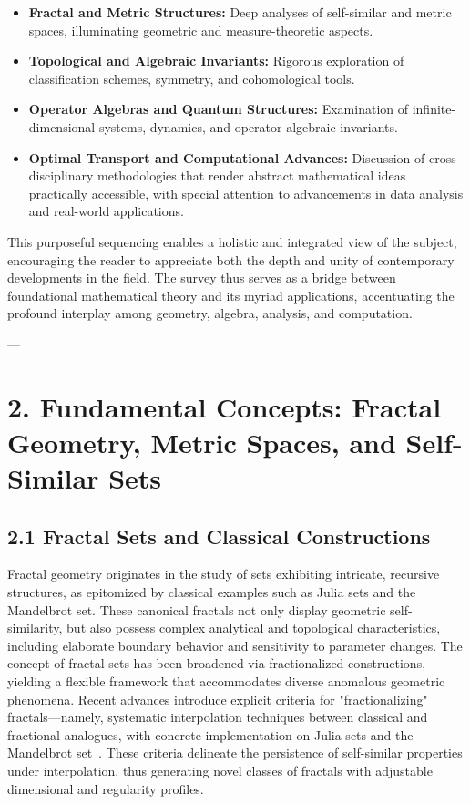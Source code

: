\documentclass[11pt]{article}
\begin{document}
\begin{itemize}
    \item \textbf{Fractal and Metric Structures:} Deep analyses of self-similar and metric spaces, illuminating geometric and measure-theoretic aspects.
    \item \textbf{Topological and Algebraic Invariants:} Rigorous exploration of classification schemes, symmetry, and cohomological tools.
    \item \textbf{Operator Algebras and Quantum Structures:} Examination of infinite-dimensional systems, dynamics, and operator-algebraic invariants.
    \item \textbf{Optimal Transport and Computational Advances:} Discussion of cross-disciplinary methodologies that render abstract mathematical ideas practically accessible, with special attention to advancements in data analysis and real-world applications.
\end{itemize}

This purposeful sequencing enables a holistic and integrated view of the subject, encouraging the reader to appreciate both the depth and unity of contemporary developments in the field. The survey thus serves as a bridge between foundational mathematical theory and its myriad applications, accentuating the profound interplay among geometry, algebra, analysis, and computation.

---
\section{2. Fundamental Concepts: Fractal Geometry, Metric Spaces, and Self-Similar Sets}

\subsection{2.1 Fractal Sets and Classical Constructions}

Fractal geometry originates in the study of sets exhibiting intricate, recursive structures, as epitomized by classical examples such as Julia sets and the Mandelbrot set. These canonical fractals not only display geometric self-similarity, but also possess complex analytical and topological characteristics, including elaborate boundary behavior and sensitivity to parameter changes. The concept of fractal sets has been broadened via fractionalized constructions, yielding a flexible framework that accommodates diverse anomalous geometric phenomena. Recent advances introduce explicit criteria for "fractionalizing" fractals—namely, systematic interpolation techniques between classical and fractional analogues, with concrete implementation on Julia sets and the Mandelbrot set~\cite{ref106}. These criteria delineate the persistence of self-similar properties under interpolation, thus generating novel classes of fractals with adjustable dimensional and regularity profiles.
\end{document}

